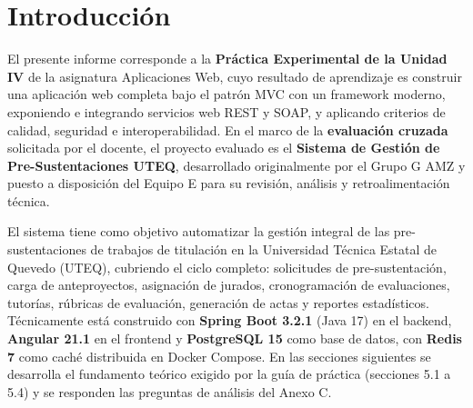 \section{Introducción}
El presente informe corresponde a la \textbf{Práctica Experimental de la Unidad IV} de la asignatura
Aplicaciones Web, cuyo resultado de aprendizaje es construir una aplicación web completa bajo el patrón MVC con
un framework moderno, exponiendo e integrando servicios web REST y SOAP, y aplicando criterios de calidad,
seguridad e interoperabilidad. En el marco de la \textbf{evaluación cruzada} solicitada por el docente, el
proyecto evaluado es el \textbf{Sistema de Gestión de Pre-Sustentaciones UTEQ}, desarrollado originalmente por
el Grupo G AMZ y puesto a disposición del Equipo E para su revisión, análisis y retroalimentación técnica.

El sistema tiene como objetivo automatizar la gestión integral de las pre-sustentaciones de trabajos de
titulación en la Universidad Técnica Estatal de Quevedo (UTEQ), cubriendo el ciclo completo: solicitudes de
pre-sustentación, carga de anteproyectos, asignación de jurados, cronogramación de evaluaciones, tutorías,
rúbricas de evaluación, generación de actas y reportes estadísticos. Técnicamente está construido con
\textbf{Spring Boot 3.2.1} (Java 17) en el backend, \textbf{Angular 21.1} en el frontend y
\textbf{PostgreSQL 15} como base de datos, con \textbf{Redis 7} como caché distribuida en Docker Compose. En
las secciones siguientes se desarrolla el fundamento teórico exigido por la guía de práctica (secciones 5.1 a
5.4) y se responden las preguntas de análisis del Anexo C.
